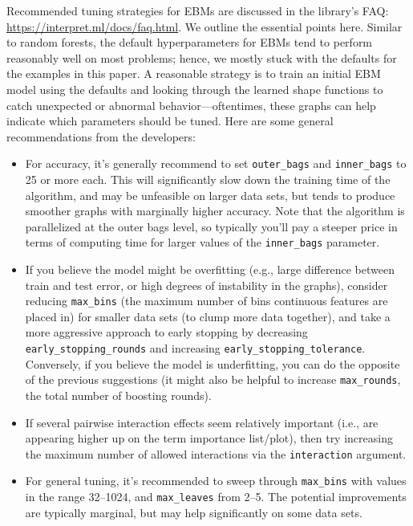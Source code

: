Recommended tuning strategies for EBMs are discussed in the
 library's FAQ: \url{https://interpret.ml/docs/faq.html}.
We outline the essential points here. Similar to random forests, the
default hyperparameters for EBMs tend to perform reasonably well on most
problems; hence, we mostly stuck with the defaults for the examples in
this paper. A reasonable strategy is to train an initial EBM model using
the defaults and looking through the learned shape functions to catch
unexpected or abnormal behavior---oftentimes, these graphs can help
indicate which parameters should be tuned. Here are some general
recommendations from the  developers:

\begin{itemize}
\item
  For accuracy, it's generally recommend to set \texttt{outer\_bags} and
  \texttt{inner\_bags} to 25 or more each. This will significantly slow
  down the training time of the algorithm, and may be unfeasible on
  larger data sets, but tends to produce smoother graphs with marginally
  higher accuracy. Note that the algorithm is parallelized at the outer
  bags level, so typically you'll pay a steeper price in terms of
  computing time for larger values of the \texttt{inner\_bags}
  parameter.
\item
  If you believe the model might be overfitting (e.g., large difference
  between train and test error, or high degrees of instability in the
  graphs), consider reducing \texttt{max\_bins} (the maximum number of
  bins continuous features are placed in) for smaller data sets (to
  clump more data together), and take a more aggressive approach to
  early stopping by decreasing \texttt{early\_stopping\_rounds} and
  increasing \texttt{early\_stopping\_tolerance}. Conversely, if you
  believe the model is underfitting, you can do the opposite of the
  previous suggestions (it might also be helpful to increase
  \texttt{max\_rounds}, the total number of boosting rounds).
\item
  If several pairwise interaction effects seem relatively important
  (i.e., are appearing higher up on the term importance list/plot), then
  try increasing the maximum number of allowed interactions via the
  \texttt{interaction} argument.
\item
  For general tuning, it's recommended to sweep through
  \texttt{max\_bins} with values in the range 32--1024, and
  \texttt{max\_leaves} from 2--5. The potential improvements are
  typically marginal, but may help significantly on some data sets.
\end{itemize}

